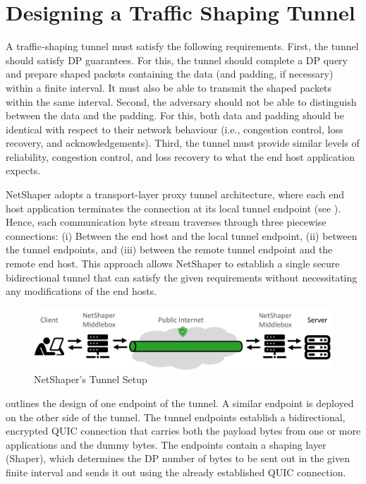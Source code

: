 \section{Designing a Traffic Shaping Tunnel}
\label{sec:netshaper-designing-traffic-shaping-tunnel}

A traffic-shaping tunnel must satisfy the following requirements.
First, the tunnel should satisfy DP guarantees.
For this, the tunnel should complete a DP query and prepare shaped packets containing the data (and padding, if necessary) within a finite interval.
It must also be able to transmit the shaped packets within the same interval.
Second, the adversary should not be able to distinguish between the data and the padding.
For this, both data and padding should be identical with respect to their network behaviour (i.e., congestion control, loss recovery, and acknowledgements).
Third, the tunnel must provide similar levels of reliability, congestion control, and loss recovery to what the end host application expects.

NetShaper adopts a transport-layer proxy tunnel architecture, where each end host application terminates the connection at its local tunnel endpoint (see ). 
Hence, each communication byte stream traverses through three piecewise connections: 
(i) Between the end host and the local tunnel endpoint, 
(ii) between the tunnel endpoints, 
and (iii) between the remote tunnel endpoint and the remote end host.
This approach allows NetShaper to establish a single secure bidirectional tunnel that can satisfy the given requirements without necessitating any modifications of the end hosts.

\begin{figure}[!htb]
    \centering
    \includegraphics[width=\columnwidth]{figures/netshaper/netshaper-setup.png}
    \caption{NetShaper's Tunnel Setup}
    \label{fig:netshaper-setup}
\end{figure}

 outlines the design of one endpoint of the tunnel. A similar endpoint is deployed on the other side of the tunnel.
The tunnel endpoints establish a bidirectional, encrypted QUIC connection that carries both the payload bytes from one or more applications and the dummy bytes.
The endpoints contain a shaping layer (Shaper), which determines the DP number of bytes to be sent out in the given finite interval and sends it out using the already established QUIC connection.


